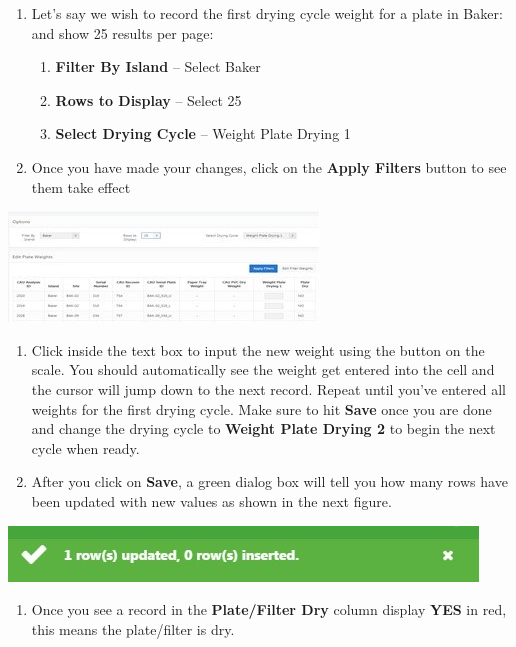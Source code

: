\documentclass[
]{book}
\providecommand{\tightlist}{%
  \setlength{\itemsep}{0pt}\setlength{\parskip}{0pt}}
\begin{document}
\begin{enumerate}
\def\labelenumi{\arabic{enumi}.}
\setcounter{enumi}{2}
\item
  Let's say we wish to record the first drying cycle weight for a plate in Baker: and show 25 results per page:

  \begin{enumerate}
  \def\labelenumii{\alph{enumii}.}
  \tightlist
  \item
    \textbf{Filter By Island} -- Select Baker
  \item
    \textbf{Rows to Display} -- Select 25
  \item
    \textbf{Select Drying Cycle} -- Weight Plate Drying 1
  \end{enumerate}
\item
  Once you have made your changes, click on the \textbf{Apply Filters} button to see them take effect
\end{enumerate}

\includegraphics{images/Data12.jpg}

\begin{enumerate}
\def\labelenumi{\arabic{enumi}.}
\setcounter{enumi}{4}
\item
  Click inside the text box to input the new weight using the button on the scale. You should automatically see the weight get entered into the cell and the cursor will jump down to the next record. Repeat until you've entered all weights for the first drying cycle. Make sure to hit \textbf{Save} once you are done and change the drying cycle to \textbf{Weight Plate Drying 2} to begin the next cycle when ready.
\item
  After you click on \textbf{Save}, a green dialog box will tell you how many rows have been updated with new values as shown in the next figure.
\end{enumerate}

\includegraphics{images/Data13.jpg}

\begin{enumerate}
\def\labelenumi{\arabic{enumi}.}
\setcounter{enumi}{6}
\tightlist
\item
  Once you see a record in the \textbf{Plate/Filter Dry} column display \textbf{YES} in red, this means the plate/filter is dry.
\end{enumerate}
\end{document}
